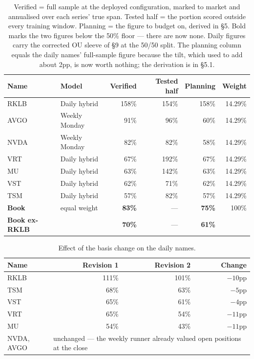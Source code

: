 \documentclass[11pt]{article}
\begin{document}
\begin{table}[H]\centering\small
\begin{tabular}{llrrrr}
\toprule
\textbf{Name} & \textbf{Model} & \textbf{Verified} & \textbf{Tested half} & \textbf{Planning} &
\textbf{Weight}\\
\midrule
\rowcolor{bckeep} RKLB & Daily hybrid   & 158\% & 154\% & 158\% & 14.29\%\\
AVGO & Weekly Monday  & 91\%  & 96\%  & 60\%  & 14.29\%\\
\rowcolor{bckeep} NVDA & Weekly Monday  & 82\%  & 82\%  & 58\%  & 14.29\%\\
VRT  & Daily hybrid   & 67\%  & 192\% & 67\%  & 14.29\%\\
\rowcolor{bckeep} MU   & Daily hybrid   & 63\%  & 142\% & 63\%  & 14.29\%\\
VST  & Daily hybrid   & 62\%  & 71\%  & 62\%  & 14.29\%\\
\rowcolor{bckeep} TSM  & Daily hybrid   & 57\%  & 82\%  & 57\%  & 14.29\%\\
\midrule
\textbf{Book} & equal weight & \textbf{83\%} & --- & \textbf{75\%} & 100\%\\
\textbf{Book ex-RKLB} & & \textbf{70\%} & --- & \textbf{61\%} & \\
\bottomrule
\end{tabular}
\caption{Verified = full sample at the deployed configuration, marked to market and annualised
over each series' true span. Tested half = the portion scored outside every training window.
Planning = the figure to budget on, derived in \S5. Bold marks the two figures below the 50\%
floor --- there are now none. Daily figures carry the corrected OU sleeve of \S9 at the 50/50
split. The planning column equals the daily names' full-sample figure because the tilt, which used
to add about 2pp, is now worth nothing; the derivation is in \S5.1.}
\end{table}

\begin{table}[H]\centering\small
\begin{tabular}{lrrr}
\toprule
\textbf{Name} & \textbf{Revision 1} & \textbf{Revision 2} & \textbf{Change}\\
\midrule
\rowcolor{bckeep} RKLB & 111\% & 101\% & $-10$pp\\
TSM  & 68\% & 63\% & $-5$pp\\
\rowcolor{bckeep} VST  & 65\% & 61\% & $-4$pp\\
VRT  & 65\% & 54\% & $-11$pp\\
\rowcolor{bckeep} MU   & 54\% & 43\% & $-11$pp\\
\midrule
NVDA, AVGO & \multicolumn{3}{l}{unchanged --- the weekly runner already valued open positions at
the close}\\
\bottomrule
\end{tabular}
\caption{Effect of the basis change on the daily names.}
\end{table}
\end{document}
